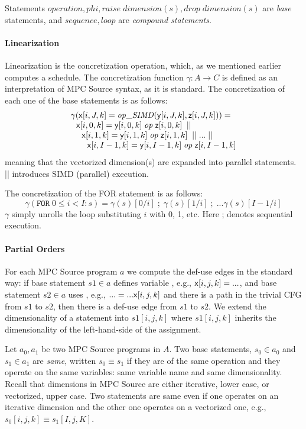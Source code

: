 \documentclass[sigconf, screen, natbib=false, dvipsnames, table]{acmart}
\theoremstyle{definition}
\begin{document}
Statements $\mathit{operation, phi, raise \; dimension(s), drop \; dimension(s)}$ are \emph{base} statements, 
and $\mathit{sequence, loop}$ are \emph{compound statements}.

\paragraph{Linearization}

Linearization is the concretization operation, which, as we mentioned earlier computes a schedule.
The concretization function $\gamma: A \rightarrow C$ is defined as an interpretation of
MPC Source syntax, as it is standard. The concretization of each one 
of the base statements is as follows: 
\[\begin{array}{l}
\gamma({\sf {x}}[i,J,k] = \mathit{op\_SIMD}({\sf y}[i,J,k], {\sf z}[i,J,k])) = \\ 
~~{\sf {x}}[i,0,k] = {\sf y}[i,0,k] \; \mathit{op} \; {\sf z}[i,0,k] \;\; || \\
~~~~{\sf {x}}[i,1,k] = {\sf y}[i,1,k] \; \mathit{op} \; {\sf z}[i,1,k] \;\; || \; ...\; || \\
~~~~~~{\sf {x}}[i,I-1,k] = {\sf y}[i,I-1,k] \; \mathit{op} \; {\sf z}[i,I-1,k]
\end{array}\]
meaning that the vectorized dimension(s) are expanded into parallel statements. || introduces SIMD (parallel) execution.

The concretization of the FOR statement is as follows:
\[ \gamma(\texttt{FOR} \; 0 \le i < I: s) = \gamma(s)[0/i] \; ; \; \gamma(s)[1/i] \; ; \; ... \gamma(s)[I-1/i] \]
$\gamma$ simply unrolls the loop substituting $i$ with 0, 1, etc. Here ; denotes sequential execution.

\paragraph{Partial Orders}

For each MPC Source program $a$ we compute the def-use edges in the standard way: if base statement $s1 \in a$ defines variable \x, e.g., ${\sf {x}}[i,j,k] = ...$, 
and base statement $s2 \in a$ uses \x, e.g., $... = ... {\sf {x}}[i,j,k]$ and there is a path in the trivial CFG from $s1$ to $s2$, then there is a def-use edge from
 $s1$ to $s2$. We extend the dimensionality of a statement into $s1[i,j,k]$ where $s1[i,j,k]$ inherits the dimensionality of the left-hand-side of the assignment.
  
 Let $a_0, a_1$ be two MPC Source programs in $A$. 
 Two base statements, $s_0 \in a_0$ and $s_1 \in a_1$ are \emph{same}, written $s_0 \equiv s_1$ if they are of the same operation and they operate on 
 the same variables: same variable name and same dimensionality. Recall that dimensions in MPC Source are either iterative, lower case, or vectorized, upper case. 
 Two statements are same even if one operates on an iterative dimension and the other one operates on a vectorized one, e.g., $s_0[i,j,k] \equiv s_1[I,j,K]$.
  
\end{document}
